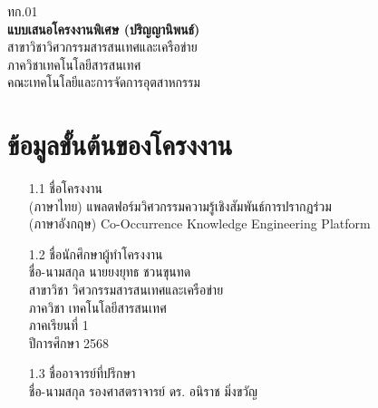 \documentclass[12pt,a4paper]{article}
\newcommand{\textlight}[1]{{\thailightfont #1}}
\begin{document}
\begin{center}
\hfill\textlight{ทก.01}\\[1cm]
\large\textbf{แบบเสนอโครงงานพิเศษ (ปริญญานิพนธ์)}\\[0.3cm]
\normalsize\textlight{สาขาวิชาวิศวกรรมสารสนเทศและเครือข่าย}\\[0.1cm]
\normalsize\textlight{ภาควิชาเทคโนโลยีสารสนเทศ}\\[0.1cm]
\normalsize\textlight{คณะเทคโนโลยีและการจัดการอุตสาหกรรม}\\[0.1cm]
\end{center}

\thispagestyle{empty}
\vspace{0.5cm}

\section{ข้อมูลขั้นต้นของโครงงาน}
\begin{enumerate}[leftmargin=2cm]
\small
    \item[1.1] ชื่อโครงงาน
    \\ \textlight{(ภาษาไทย)} \hspace{0.5cm} {แพลตฟอร์มวิศวกรรมความรู้เชิงสัมพันธ์การปรากฏร่วม}
    \\ \textlight{(ภาษาอังกฤษ)} \hspace{0.04cm} {Co-Occurrence Knowledge Engineering Platform}

    \item[1.2] ชื่อนักศึกษาผู้ทำโครงงาน
    \\ \textlight{ชื่อ-นามสกุล} \hspace{0.4cm} {นายยงยุทธ ชวนขุนทด}
    \\ \textlight{สาขาวิชา} \hspace{0.935cm} {วิศวกรรมสารสนเทศและเครือข่าย}
    \\ \textlight{ภาควิชา} \hspace{1.12cm} {เทคโนโลยีสารสนเทศ}
    \\ \textlight{ภาคเรียนที่} \hspace{0.7cm} {1}
    \\ \textlight{ปีการศึกษา} \hspace{0.67cm} {2568}

    \item[1.3] ชื่ออาจารย์ที่ปรึกษา
    \\ \textlight{ชื่อ-นามสกุล} \hspace{0.47cm} {รองศาสตราจารย์ ดร. อนิราช มิ่งขวัญ}
\end{enumerate}
\end{document}
